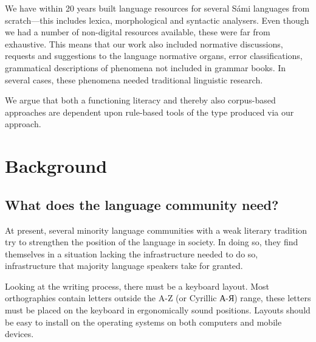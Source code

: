 \documentclass[free]{flammie}
\begin{document}
We have within 20 years built language resources for several Sámi languages from
scratch---this includes lexica, morphological and syntactic analysers.  Even
though we had a number of non-digital resources available, these were far from
exhaustive. This means that our work also included normative discussions,
requests and suggestions to the language normative organs, error
classifications, grammatical descriptions of phenomena not included in grammar
books. In several cases, these phenomena needed traditional linguistic research.

We argue that both a functioning literacy and thereby also corpus-based
approaches are dependent upon rule-based tools of the type produced via our
approach.























\section{Background}\label{sec:background}





















\subsection{What does the language community need?}

At present, several minority language communities with a weak literary tradition
try to strengthen the position of the language in society.  In doing so, they
find themselves in a situation lacking the infrastructure needed to do so,
infrastructure that majority language speakers take for granted.

Looking at the writing process, there must be a keyboard layout. Most
orthographies contain letters outside the A-Z (or Cyrillic А-Я) range, these
letters must be placed on the keyboard in ergonomically sound positions. Layouts
should be easy to install on the operating systems on both computers and mobile
devices.
\end{document}
